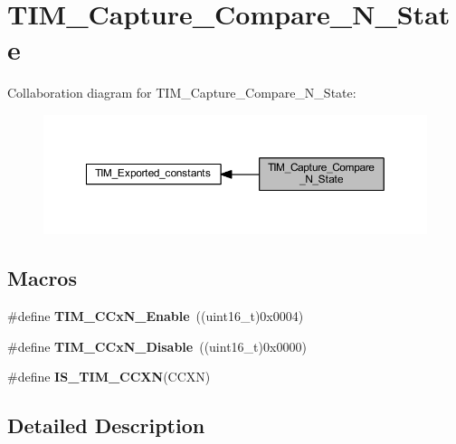 \hypertarget{group___t_i_m___capture___compare___n___state}{}\section{T\+I\+M\+\_\+\+Capture\+\_\+\+Compare\+\_\+\+N\+\_\+\+State}
\label{group___t_i_m___capture___compare___n___state}
Collaboration diagram for T\+I\+M\+\_\+\+Capture\+\_\+\+Compare\+\_\+\+N\+\_\+\+State\+:\nopagebreak
\begin{figure}[H]
\begin{center}
\leavevmode
\includegraphics[width=350pt]{group___t_i_m___capture___compare___n___state}
\end{center}
\end{figure}
\subsection*{Macros}
\begin{DoxyCompactItemize}
\item 
\mbox{\label{group___t_i_m___capture___compare___n___state_gab534ddf23d317eb912564292c1cede2d}} 
\#define {\bfseries T\+I\+M\+\_\+\+C\+Cx\+N\+\_\+\+Enable}~((uint16\+\_\+t)0x0004)
\item 
\mbox{\label{group___t_i_m___capture___compare___n___state_ga0d7d46aeba33ed197aa39775bc527d7d}} 
\#define {\bfseries T\+I\+M\+\_\+\+C\+Cx\+N\+\_\+\+Disable}~((uint16\+\_\+t)0x0000)
\item 
\#define {\bfseries I\+S\+\_\+\+T\+I\+M\+\_\+\+C\+C\+XN}(C\+C\+XN)
\end{DoxyCompactItemize}


\subsection{Detailed Description}


